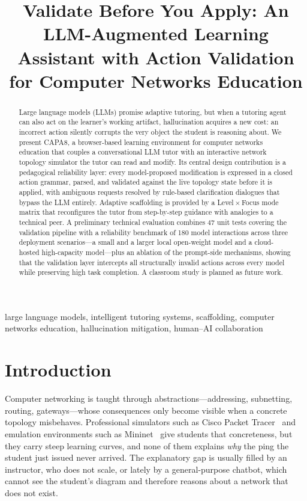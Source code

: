 \documentclass[conference,a4paper]{IEEEtran}
\newcommand{\bTotalCalls}{180}   %
\begin{document}
\title{Validate Before You Apply: An LLM-Augmented Learning Assistant with Action Validation for Computer Networks Education}

\author{
}

\maketitle

\begin{abstract}
Large language models (LLMs) promise adaptive tutoring, but when a tutoring agent can also act on the learner's working artifact, hallucination acquires a new cost: an incorrect action silently corrupts the very object the student is reasoning about. We present CAPA8, a browser-based learning environment for computer networks education that couples a conversational LLM tutor with an interactive network topology simulator the tutor can read and modify. Its central design contribution is a pedagogical reliability layer: every model-proposed modification is expressed in a closed action grammar, parsed, and validated against the live topology state before it is applied, with ambiguous requests resolved by rule-based clarification dialogues that bypass the LLM entirely. Adaptive scaffolding is provided by a Level\,$\times$\,Focus mode matrix that reconfigures the tutor from step-by-step guidance with analogies to a technical peer. A preliminary technical evaluation combines 47 unit tests covering the validation pipeline with a reliability benchmark of \bTotalCalls{} model interactions across three deployment scenarios---a small and a larger local open-weight model and a cloud-hosted high-capacity model---plus an ablation of the prompt-side mechanisms, showing that the validation layer intercepts all structurally invalid actions across every model while preserving high task completion. A classroom study is planned as future work.
\end{abstract}

\begin{IEEEkeywords}
large language models, intelligent tutoring systems, scaffolding, computer networks education, hallucination mitigation, human--AI collaboration
\end{IEEEkeywords}

\section{Introduction}
Computer networking is taught through abstractions---addressing, subnetting, routing, gateways---whose consequences only become visible when a concrete topology misbehaves. Professional simulators such as Cisco Packet Tracer~\cite{packettracer} and emulation environments such as Mininet~\cite{lantz2010mininet} give students that concreteness, but they carry steep learning curves, and none of them explains \emph{why} the ping the student just issued never arrived. The explanatory gap is usually filled by an instructor, who does not scale, or lately by a general-purpose chatbot, which cannot see the student's diagram and therefore reasons about a network that does not exist.
\end{document}
